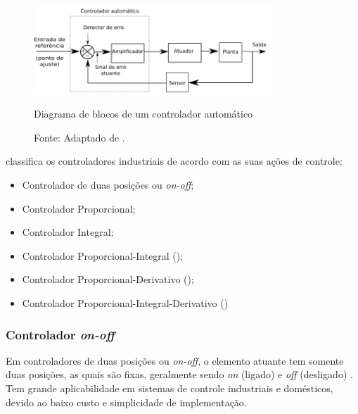 \begin{figure}[h!]
 \centering
 \captionsetup{width=0.8\textwidth,font=footnotesize,textfont=bf}
 \includegraphics[width=0.8\textwidth,height=0.5\textheight,keepaspectratio]{figuras/Controlador.png}
 \caption{Diagrama de blocos de um controlador automático \label{fig:controlador}}
 \vspace{-0.2cm}
 \caption*{Fonte: Adaptado de \cite[p.18]{ogata}.}
\end{figure}

 classifica os controladores industriais de acordo com as suas ações de controle:
\begin{itemize}
 \item Controlador de duas posições ou \textit{on-off}; %
 \item Controlador Proporcional;
 \item Controlador Integral;
 \item Controlador Proporcional-Integral ();
 \item Controlador Proporcional-Derivativo ();
 \item Controlador Proporcional-Integral-Derivativo ()
\end{itemize}

\subsubsection{Controlador \textit{on-off}}

Em controladores de duas posições ou \textit{on-off}, o elemento atuante tem somente duas posições, as quais são fixas, geralmente sendo 
\textit{on} (ligado) e \textit{off} (desligado) \cite{ogata}. Tem grande aplicabilidade em sistemas de controle industriais e 
domésticos, devido ao baixo custo e simplicidade de implementação.

